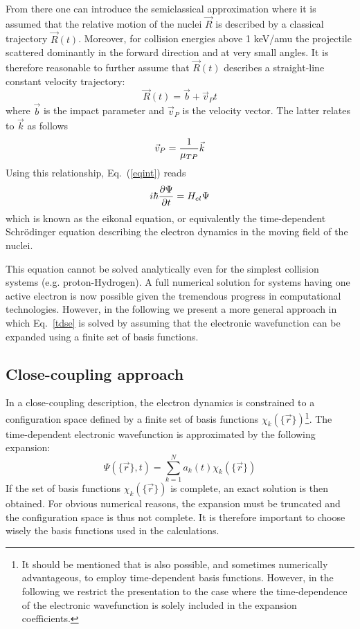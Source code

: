 \documentclass[a4paper, 10 pt]{report}
\begin{document}
From there one can introduce the semiclassical approximation where it is assumed that the relative motion of the nuclei $\vec{R}$ is described by a classical trajectory $\vec{R}(t)$. Moreover, for collision energies above 1 keV/amu the projectile scattered dominantly in the forward direction and at very small angles. It is therefore reasonable to further assume that  $\vec{R}(t)$ describes a straight-line constant velocity trajectory:
\begin{equation}
\vec{R}(t) = \vec{b} + \vec{v}_Pt
\label{ipm}
\end{equation}
where $\vec{b}$ is the impact parameter and $\vec{v}_P$ is the velocity vector. The latter relates to $\vec{k}$ as follows
\begin{equation}
\vec{v}_P = {1 \over \mu_{TP}} \vec{k}
\label{vk}
\end{equation}
Using this relationship, Eq.~(\ref{eqint}) reads
\begin{equation}
i\hbar{\partial \Psi \over \partial t}=H_{el}\Psi 
\label{tdse}
\end{equation}
which is known as the eikonal equation, or equivalently the time-dependent Schr\"odinger equation describing the electron dynamics in the moving field of the nuclei.

This equation cannot be solved analytically even for the simplest collision systems (e.g. proton-Hydrogen). A full numerical solution for systems having one active electron is now possible given the tremendous progress in computational technologies. However, in the following we present a more general approach in which Eq.~\ref{tdse} is solved by assuming that the electronic wavefunction can be expanded using a finite set of basis functions. 

\subsection{Close-coupling approach}
\label{sec:cc}

In a close-coupling description, the electron dynamics is constrained to a configuration space defined by a finite set of basis functions $\chi_k(\{\vec{r}\})$\footnote{It should be mentioned that is also possible, and sometimes numerically advantageous, to employ time-dependent basis functions. However, in the following we restrict the presentation to the case where the time-dependence of the electronic wavefunction is solely included in the expansion coefficients.}. The time-dependent electronic wavefunction is approximated by the following expansion:
\begin{equation}
\Psi(\{\vec{r}\},t) = \sum_{k=1}^N a_k(t) \chi_k(\{\vec{r}\})
\label{ansatz}
\end{equation}
If the set of basis functions $\chi_k(\{\vec{r}\})$ is complete, an exact solution is then obtained. For obvious numerical reasons, the expansion must be truncated and the configuration space is thus not complete. It is therefore important to choose wisely the basis functions used in the calculations. 
\end{document}
